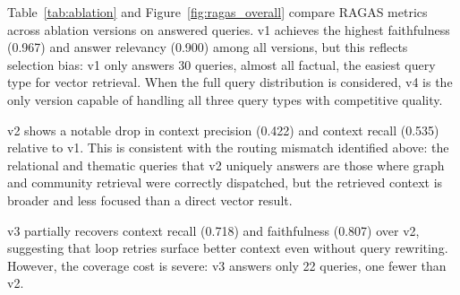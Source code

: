 \documentclass[11pt]{article}
\begin{document}
\begin{table}[t]
\centering
\small
{}
\caption{RAGAS metrics per ablation version, computed on answered queries
         only (refused queries excluded). The bottom row shows the number
         of answered queries per version. v1 scores reflect selection
         bias: it answers only 30 queries, nearly all factual.}
\label{tab:ablation}
\end{table}

Table~\ref{tab:ablation} and Figure~\ref{fig:ragas_overall} compare RAGAS
metrics across ablation versions on answered queries. v1 achieves the
highest faithfulness (0.967) and answer relevancy (0.900) among all
versions, but this reflects selection bias: v1 only answers 30 queries,
almost all factual, the easiest query type for vector retrieval. When the
full query distribution is considered, v4 is the only version capable of
handling all three query types with competitive quality.

v2 shows a notable drop in context precision (0.422) and context recall
(0.535) relative to v1. This is consistent with the routing mismatch
identified above: the relational and thematic queries that v2 uniquely
answers are those where graph and community retrieval were correctly
dispatched, but the retrieved context is broader and less focused than a
direct vector result.

v3 partially recovers context recall (0.718) and faithfulness (0.807) over
v2, suggesting that loop retries surface better context even without query
rewriting. However, the coverage cost is severe: v3 answers only 22
queries, one fewer than v2.
\end{document}
